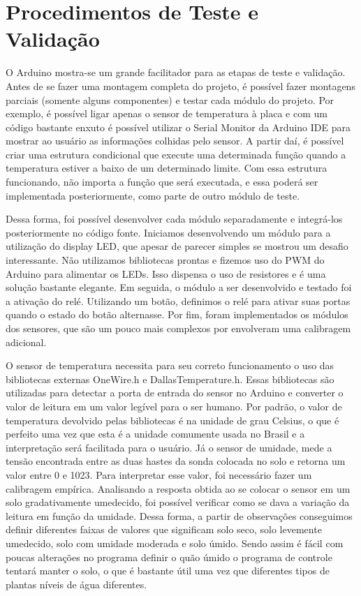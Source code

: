 \documentclass[a4paper,12pt]{article}
\begin{document}
\newpage
\section{Procedimentos de Teste e Validação}

    O Arduino mostra-se um grande facilitador para as etapas de teste e validação. Antes de se fazer uma montagem completa do projeto, é possível fazer montagens parciais (somente alguns componentes) e testar cada módulo do projeto. Por exemplo, é possível ligar apenas o sensor de temperatura à placa e com um código bastante enxuto é possível utilizar o Serial Monitor da Arduino IDE para mostrar ao usuário as informações colhidas pelo sensor. A partir daí, é possível criar uma estrutura condicional que execute uma determinada função quando a temperatura estiver a baixo de um determinado limite. Com essa estrutura funcionando, não importa a função que será executada, e essa poderá ser implementada posteriormente, como parte de outro módulo de teste.
    
    Dessa forma, foi possível desenvolver cada módulo separadamente e integrá-los posteriormente no código fonte. Iniciamos desenvolvendo um módulo para a utilização do display LED, que apesar de parecer simples se mostrou um desafio interessante. Não utilizamos bibliotecas prontas e fizemos uso do PWM do Arduino para alimentar os LEDs. Isso dispensa o uso de resistores e é uma solução bastante elegante. Em seguida, o módulo a ser desenvolvido e testado foi a ativação do relé. Utilizando um botão, definimos o relé para ativar suas portas quando o estado do botão alternasse. Por fim, foram implementados os módulos dos sensores, que são um pouco mais complexos por envolveram uma  calibragem adicional.
    
    O sensor de temperatura necessita para seu correto funcionamento o uso das bibliotecas externas OneWire.h e DallasTemperature.h. Essas bibliotecas são utilizadas para detectar a porta de entrada do sensor no Arduino e converter o valor de leitura em um valor legível para o ser humano. Por padrão, o valor de temperatura devolvido pelas bibliotecas é na unidade de grau Celsius, o que é perfeito uma vez que esta é a unidade comumente usada no Brasil e a interpretação será facilitada para o usuário. Já o sensor de umidade, mede a tensão encontrada entre as duas hastes da sonda colocada no solo e retorna um valor entre 0 e 1023. Para interpretar esse valor, foi necessário fazer um calibragem empírica. Analisando a resposta obtida ao se colocar o sensor em um solo gradativamente umedecido, foi possível verificar como se dava a variação da leitura em função da umidade. Dessa forma, a partir de observações conseguimos definir diferentes faixas de valores que significam solo seco, solo levemente umedecido, solo com umidade moderada e solo úmido. Sendo assim é fácil com poucas alterações no programa definir o quão úmido o programa de controle tentará manter o solo, o que é bastante útil uma vez que diferentes tipos de plantas níveis de água diferentes.
    
\end{document}
